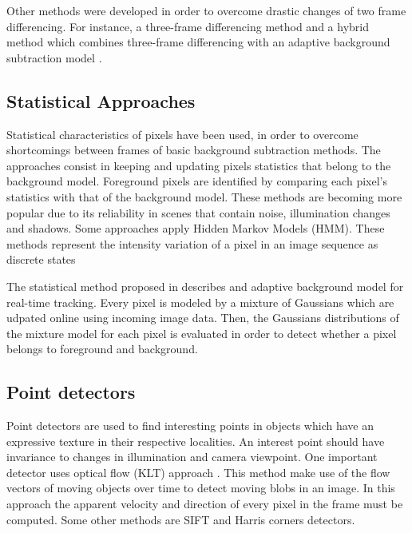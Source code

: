 Other methods were developed in order to overcome drastic changes of two frame
differencing. For instance, a three-frame differencing method \cite{Wang2003} 
and a hybrid method which combines three-frame differencing with an adaptive
background subtraction model \cite{Collins2000}.

\subsection{Statistical Approaches}

Statistical characteristics of pixels have been used, in order to overcome
shortcomings between frames of basic background subtraction methods. The
approaches consist in keeping and updating pixels statistics that belong to the
background model. Foreground pixels are identified by comparing each pixel's
statistics with that of the background model. These methods are becoming more
popular due to its reliability in scenes that contain noise, illumination
changes and shadows. Some approaches apply Hidden Markov Models (HMM). These
methods \cite{Stenger2001,Rittscher2000} represent the intensity variation of a
pixel in an image sequence as discrete states

The statistical method proposed in \cite{Pham2010} describes and adaptive
background model for real-time tracking. Every pixel is modeled by a mixture of
Gaussians which are udpated online using incoming image data. Then, the
Gaussians distributions of the mixture model for each pixel is evaluated
in order to detect whether a pixel belongs to foreground and background.

\subsection{Point detectors}

Point detectors are used to find interesting points in objects which have an
expressive texture in their respective localities. An interest point should
have invariance to changes in illumination and camera viewpoint. One important
detector uses optical flow (KLT) approach \cite{Shi1994}. This method make use
of the flow vectors of moving objects over time to detect moving blobs in an
image. In this approach the apparent velocity and direction of every pixel in
the frame must be computed. Some other methods are SIFT \cite{Lowe2004b} and
Harris \cite{Harris1988} corners detectors.


